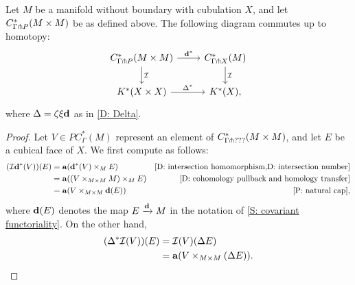 \documentclass{amsart}
\begin{document}
\begin{proposition}\label{P: diag/intersect}
	Let $M$ be a manifold without boundary with cubulation $X$, and let $C^*_{\Gamma \pitchfork P}(M \times M)$ be as defined above.
	The following diagram commutes up to homotopy:
	\[
	\begin{tikzcd}
	C^*_{\Gamma \pf P}(M \times M) \arrow[r,"\diag^*"] \arrow[d,"\mc I"]& C^*_{\Gamma \pf X}(M) \arrow[d,"\mc I"]  \\
	 \arrow[r,"\Delta^*"] K^*(X\times X)&K^*(X),
	\end{tikzcd}
	\]
	where $\Delta = \zeta \xi \mathbf{d}$ as in \cref{D: Delta}.
\end{proposition}
\begin{proof}
	Let $V \in PC^*_\Gamma(M)$ represent an element of $C^*_{\Gamma \pitchfork ???}(M \times M)$, and let $E$ be a cubical face of $X$.
	We first compute as follows:
	\begin{align*}
		(\mc I \diag^*(V))(E) & = \aug(\diag^*(V) \times_M  E) &\text{\cref{D: intersection homomorphism,D: intersection number}}\\
		&=\aug((V \times_{M \times M} M) \times_M E) &\text{\cref{D: cohomology pullback and homology transfer}}\\
		&=\aug(V \times_{M \times M} \diag(E)) &\text{\cref{P: natural cap}},
	\end{align*}
	where $\mathbf{d}(E)$ denotes the map $E \xrightarrow{\mathbf{d}} M$ in the notation of \cref{S: covariant functoriality}.
	On the other hand,
		\begin{align*}
		(\Delta^*\mathcal{I}(V))(E) & = \mathcal{I}(V)(\Delta E)\\
		&=\mathbf{a}(V \times_{M \times M} (\Delta E)).
	\end{align*}


\end{proof}
\end{document}
